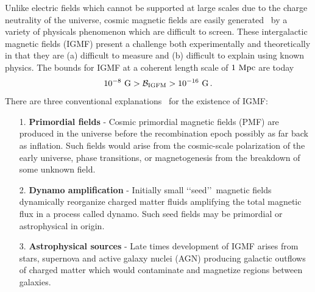 \documentclass[a4paper]{article}
\begin{document}
Unlike electric fields which cannot be supported at large scales due to the charge neutrality of the universe, cosmic magnetic fields are easily generated~\cite{kronberg1994extragalactic,gaensler2004origin,durrer2013cosmological} by a variety of physicals phenomenon which are difficult to screen. These intergalactic magnetic fields (IGMF) present a challenge both experimentally and theoretically in that they are (a) difficult to measure and (b) difficult to explain using known physics. The bounds for IGMF at a coherent length scale of $1{\rm\ Mpc}$ are today~\cite{neronov2010evidence,taylor2011extragalactic,pshirkov2015new,vernstrom2021discovery}
\begin{align}
    \label{igmf}
    10^{-8}{\rm\ G}>\mathcal{B}_{\rm IGFM}>10^{-16}{\rm\ G}\,.
\end{align}
There are three conventional explanations~\cite{batista2021gammaray} for the existence of IGMF:
\begin{itemize}
    \item [1.] \textbf{Primordial fields} - Cosmic primordial magnetic fields (PMF) are produced in the universe before the recombination epoch possibly as far back as inflation. Such fields would arise from the cosmic-scale polarization of the early universe, phase transitions, or magnetogenesis from the breakdown of some unknown field.
    \item [2.] \textbf{Dynamo amplification} - Initially small \lq\lq seed\rq\rq\ magnetic fields dynamically reorganize charged matter fluids amplifying the total magnetic flux in a process called dynamo. Such seed fields may be primordial or astrophysical in origin.
    \item [3.] \textbf{Astrophysical sources} - Late times development of IGMF arises from stars, supernova and active galaxy nuclei (AGN) producing galactic outflows of charged matter which would contaminate and magnetize regions between galaxies.
\end{itemize}
\end{document}
